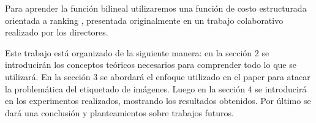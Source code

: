 Para aprender la función bilineal utilizaremos una función de costo estructurada orientada a ranking \cite{PaperDirectors}, presentada originalmente en un trabajo colaborativo realizado por los directores.

Este trabajo está organizado de la siguiente manera: en la sección 2 se introducirán los conceptos teóricos necesarios para comprender todo lo que se utilizará. En la sección 3 se abordará el enfoque utilizado en el paper \cite{PaperDirectors} para atacar la problemática del etiquetado de imágenes. Luego en la sección 4 se introducirá en los experimentos realizados, mostrando los resultados obtenidos. Por último se dará una conclusión y planteamientos sobre trabajos futuros.
